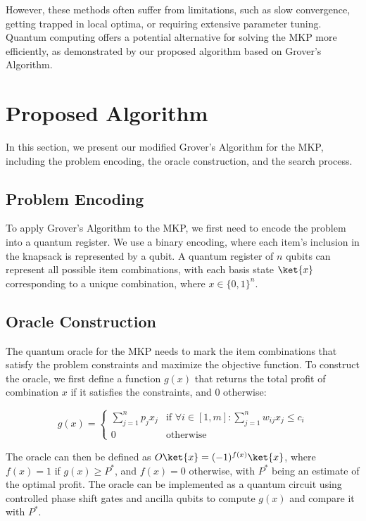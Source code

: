 However, these methods often suffer from limitations, such as slow convergence, getting trapped in local optima, or requiring extensive parameter tuning. Quantum computing offers a potential alternative for solving the MKP more efficiently, as demonstrated by our proposed algorithm based on Grover's Algorithm.

\section{Proposed Algorithm} \label{sec:proposed_algorithm}
In this section, we present our modified Grover's Algorithm for the MKP, including the problem encoding, the oracle construction, and the search process.

\subsection{Problem Encoding}
To apply Grover's Algorithm to the MKP, we first need to encode the problem into a quantum register. We use a binary encoding, where each item's inclusion in the knapsack is represented by a qubit. A quantum register of $n$ qubits can represent all possible item combinations, with each basis state $\ket{x}$ corresponding to a unique combination, where $x \in \{0,1\}^n$.

\subsection{Oracle Construction}
The quantum oracle for the MKP needs to mark the item combinations that satisfy the problem constraints and maximize the objective function. To construct the oracle, we first define a function $g(x)$ that returns the total profit of combination $x$ if it satisfies the constraints, and $0$ otherwise:

\begin{equation}
g(x) = \begin{cases}
\sum_{j=1}^{n} p_j x_j & \text{if } \forall i \in [1,m]: \sum_{j=1}^{n} w_{ij} x_j \leq c_i \\
0 & \text{otherwise}
\end{cases}
\end{equation}

The oracle can then be defined as $O\ket{x} = (-1)^{f(x)}\ket{x}$, where $f(x) = 1$ if $g(x) \geq P^*$, and $f(x) = 0$ otherwise, with $P^*$ being an estimate of the optimal profit. The oracle can be implemented as a quantum circuit using controlled phase shift gates and ancilla qubits to compute $g(x)$ and compare it with $P^*$.

